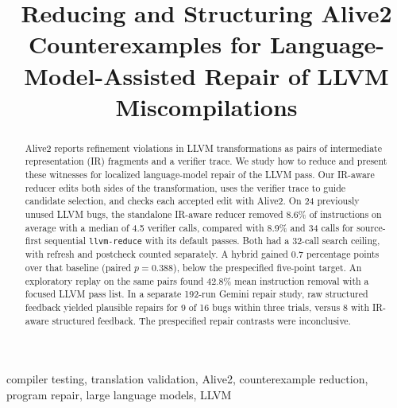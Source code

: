 \documentclass[conference]{IEEEtran}
\begin{document}
\title{Reducing and Structuring Alive2 Counterexamples for Language-Model-Assisted Repair of LLVM Miscompilations}

\author{%
\and
{}
\and
{}
\and
{}
}

\maketitle

\begin{abstract}
Alive2 reports refinement violations in LLVM transformations as pairs of intermediate representation (IR) fragments and a verifier trace. We study how to reduce and present these witnesses for localized language-model repair of the LLVM pass. Our IR-aware reducer edits both sides of the transformation, uses the verifier trace to guide candidate selection, and checks each accepted edit with Alive2. On 24 previously unused LLVM bugs, the standalone IR-aware reducer removed 8.6\% of instructions on average with a median of 4.5 verifier calls, compared with 8.9\% and 34 calls for source-first sequential \texttt{llvm-reduce} with its default passes. Both had a 32-call search ceiling, with refresh and postcheck counted separately. A hybrid gained 0.7 percentage points over that baseline (paired $p=0.388$), below the prespecified five-point target. An exploratory replay on the same pairs found 42.8\% mean instruction removal with a focused LLVM pass list. In a separate 192-run Gemini repair study, raw structured feedback yielded plausible repairs for 9 of 16 bugs within three trials, versus 8 with IR-aware structured feedback. The prespecified repair contrasts were inconclusive.
\end{abstract}

\begin{IEEEkeywords}
compiler testing, translation validation, Alive2, counterexample reduction, program repair, large language models, LLVM
\end{IEEEkeywords}
\end{document}
